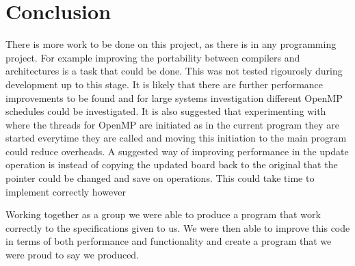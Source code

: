\documentclass[12pt]{article}    %
\numberwithin{equation}{section}
\begin{document}
\section{Conclusion}
There is more work to be done on this project, as there is in any programming project.
For example improving the portability between compilers and architectures is a task that could be done.
This was not tested rigourosly during development up to this stage.
It is likely that there are further performance improvements to be found and for large systems investigation different OpenMP schedules could be investigated.
It is also suggested that experimenting with where the threads for OpenMP are initiated as in the current program they are started everytime they are called and moving this initiation to the main program could reduce overheads.
A suggested way of improving performance in the update operation is instead of copying the updated board back to the original that the pointer could be changed and save on operations.
This could take time to implement correctly however

Working together as a group we were able to produce a program that work correctly to the specifications given to us.
We were then able to improve this code in terms of both performance and functionality and create a program that we were proud to say we produced.
\end{document}
